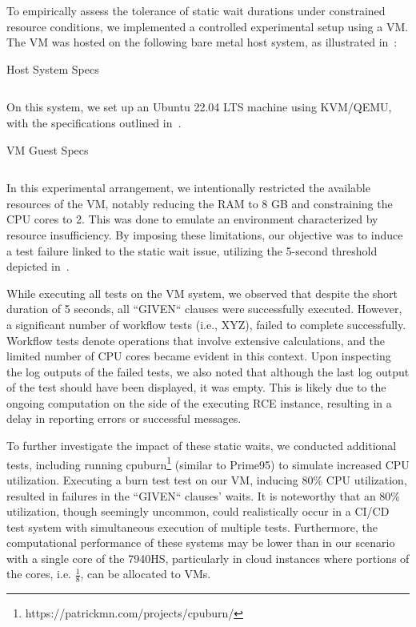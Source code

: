 To empirically assess the tolerance of static wait durations under constrained resource conditions, we implemented a controlled experimental setup using a \ac{VM}. The \ac{VM} was hosted on the following bare metal host system, as illustrated in~:

\begin{listing}
\caption{Host System Specs}
\label{lst:host-specs}
\inputminted{text}{files/neofetch-host.txt}
\end{listing}

On this system, we set up an Ubuntu 22.04 LTS machine using KVM/QEMU, with the specifications outlined in~.
\begin{listing}
\caption{\acl{VM} Guest Specs}
\label{lst:vm-specs}
\inputminted{text}{files/neofetch-test-host.txt}
\end{listing}

In this experimental arrangement, we intentionally restricted the available resources of the \ac{VM}, notably reducing the RAM to 8 GB and constraining the CPU cores to 2. This was done to emulate an environment characterized by resource insufficiency. By imposing these limitations, our objective was to induce a test failure linked to the static wait issue, utilizing the 5-second threshold depicted in~. 

While executing all tests on the \ac{VM} system, we observed that despite the short duration of 5 seconds, all ``GIVEN`` clauses were successfully executed. However, a significant number of workflow tests (i.e., XYZ), failed to complete successfully. Workflow tests denote operations that involve extensive calculations, and the limited number of CPU cores became evident in this context. Upon inspecting the log outputs of the failed tests, we also noted that although the last log output of the test should have been displayed, it was empty. This is likely due to the ongoing computation on the side of the executing \ac{RCE} instance, resulting in a delay in reporting errors or successful messages.

To further investigate the impact of these static waits, we conducted additional tests, including running cpuburn\footnote{https://patrickmn.com/projects/cpuburn/} (similar to Prime95) to simulate increased CPU utilization. Executing a burn test test on our VM, inducing 80\% CPU utilization, resulted in failures in the ``GIVEN`` clauses' waits. It is noteworthy that an 80\% utilization, though seemingly uncommon, could realistically occur in a CI/CD test system with simultaneous execution of multiple tests. Furthermore, the computational performance of these systems may be lower than in our scenario with a single core of the 7940HS, particularly in cloud instances where portions of the cores, i.e. $\frac{1}{8}$, can be allocated to \acp{VM}.

